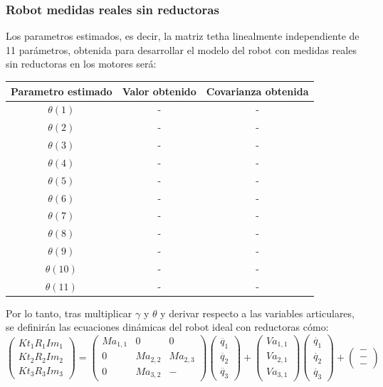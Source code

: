 \subsubsection{Robot medidas reales sin reductoras}
Los parametros estimados, es decir, la matriz tetha linealmente independiente de 11 parámetros, obtenida para desarrollar el modelo del robot con medidas reales sin reductoras en los motores será:
\begin{center}
	\begin{tabular}{| c | c | c |}

		\hline
		Parametro estimado & Valor obtenido & Covarianza obtenida \\
		\hline
		$\theta(1) $ & - & - \\
		\hline
		$\theta(2) $ & - & - \\
		\hline
		$\theta(3) $ & - & - \\
		\hline
		$\theta(4) $ & - & - \\
		\hline
		$\theta(5) $ & - & - \\
		\hline
		$\theta(6) $ & - & - \\
		\hline
		$\theta(7) $ & - & - \\
		\hline
		$\theta(8) $ & - & - \\
		\hline
		$\theta(9) $ & - & - \\
		\hline
		$\theta(10) $ & - & - \\
		\hline
		$\theta(11) $ & - & - \\
		\hline
	\end{tabular}
\end{center}
Por lo tanto, tras multiplicar $\gamma$ y $\theta$ y derivar respecto a las variables articulares, se definirán las ecuaciones dinámicas del robot ideal con reductoras cómo:\\
\[
	\begin{pmatrix}
	Kt_{1}R_{1}Im_{1} \\
	Kt_{2}R_{2}Im_{2} \\
	Kt_{3}R_{3}Im_{3}
	\end{pmatrix} =
	\begin{pmatrix}
	Ma_{1,1} & 0 & 0 \\
	0 & Ma_{2,2} & Ma_{2,3}\\
	0 & Ma_{3,2} & -
	\end{pmatrix}
	\begin{pmatrix}
	\ddot{q_{1}} \\
	\ddot{q_{2}}  \\
	\ddot{q_{3}}
\end{pmatrix} +
\begin{pmatrix}
	Va_{1,1}\\
	Va_{2,1} \\
  Va_{3,1}
\end{pmatrix}
\begin{pmatrix}
		\dot{q_{1}} \\
		\dot{q_{2}}  \\
		\dot{q_{3}}
\end{pmatrix} +
\begin{pmatrix}
-	\\
- \\
-
\end{pmatrix}
\]
